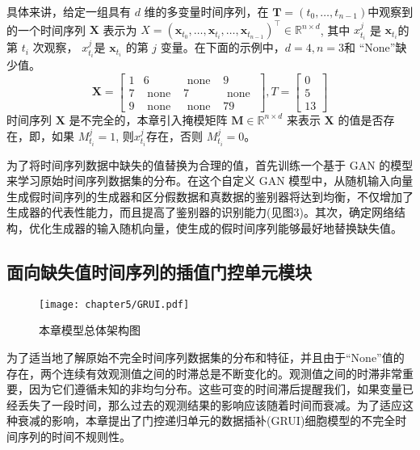 具体来讲，给定一组具有 $d$ 维的多变量时间序列，在 $\boldsymbol{T}=\left(t_0, \ldots, t_{n-1}\right)$中观察到的一个时间序列  $\boldsymbol{X}$ 表示为 ${X}=\left(\boldsymbol{x}_{t_0}, \ldots, \boldsymbol{x}_{t_i}, \ldots, \boldsymbol{x}_{t_{n-1}}\right)^{\top} \in \mathbb{R}^{n \times d}$, 其中 $x_{t_i}^j$  是 $\boldsymbol{x}_{t_i}$的第 $t_i$ 次观察， $x_{t_i}^j$是 $\boldsymbol{x}_{t_i}$ 的第 $j$  变量。在下面的示例中，$d=4, n=3$和 “None”缺少值。
\begin{equation}
    \boldsymbol{X}=\left[\begin{array}{cccc}
    1 & 6 & \text { none } & 9 \\
    7 & \text { none } & 7 & \text { none } \\
    9 & \text { none } & \text { none } & 79
    \end{array}\right], T=\left[\begin{array}{c}
    0 \\
    5 \\
    13
    \end{array}\right]
    \end{equation}
时间序列 $\boldsymbol{X}$  是不完全的，本章引入掩模矩阵 $\boldsymbol{M} \in \mathbb{R}^{n \times d}$ 来表示 $\boldsymbol{X}$  的值是否存在，即，如果 $M_{t_i}^j=1$, 则$x_{t_i}^j$存在，否则 $M_{t_i}^j=0$。

为了将时间序列数据中缺失的值替换为合理的值，首先训练一个基于 GAN 的模型来学习原始时间序列数据集的分布。在这个自定义 GAN 模型中，从随机输入向量生成假时间序列的生成器和区分假数据和真数据的鉴别器将达到均衡，不仅增加了生成器的代表性能力，而且提高了鉴别器的识别能力(见图3)。其次，确定网络结构，优化生成器的输入随机向量，使生成的假时间序列能够最好地替换缺失值。

\subsection{面向缺失值时间序列的插值门控单元模块}
\begin{figure}[ht]
    \centering
    \texttt{[image: chapter5/GRUI.pdf]}
    \caption{本章模型总体架构图}
    \end{figure}
为了适当地了解原始不完全时间序列数据集的分布和特征，并且由于“None”值的存在，两个连续有效观测值之间的时滞总是不断变化的。观测值之间的时滞非常重要，因为它们遵循未知的非均匀分布。这些可变的时间滞后提醒我们，如果变量已经丢失了一段时间，那么过去的观测结果的影响应该随着时间而衰减。为了适应这种衰减的影响，本章提出了门控递归单元的数据插补(GRUI)细胞模型的不完全时间序列的时间不规则性。

